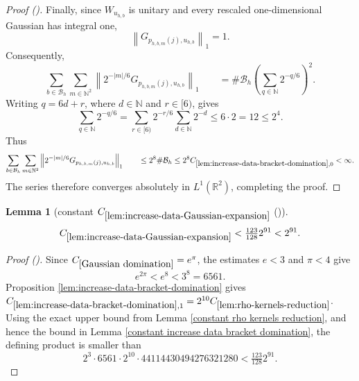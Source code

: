 \documentclass[12pt,reqno]{amsart}
\newcommand{\auto}{{({\tiny\faCar})}}
\theoremstyle{plain}
\newtheorem{lemma}[theorem]{Lemma}
\numberwithin{equation}{section}
\theoremstyle{remark}
\newcommand{\uses}[1]{}
\newcommand{\usesdefs}[1]{}
\begin{document}
\begin{proof}[Proof \auto]
Finally, since \(W_{u_{h,b}}\) is unitary and every rescaled
one-dimensional Gaussian has integral one,
\[
\left\|
G_{p_{h,b,m}(j),u_{h,b}}
\right\|_1
=
1.
\]
Consequently,
\[
\sum_{b\in\mathcal B_h} \sum_{m\in\mathbb N^2} \left\| 2^{-|m|/6} G_{p_{h,b,m}(j),u_{h,b}} \right\|_1 \qquad= \#\mathcal B_h \left( \sum_{q\in\mathbb N}2^{-q/6} \right)^2.
\]
Writing \(q=6d+r\), where \(d\in\mathbb N\) and \(r\in[6)\), gives
\[
\sum_{q\in\mathbb N}2^{-q/6} = \sum_{r\in[6)} 2^{-r/6} \sum_{d\in\mathbb N}2^{-d} \leq 6\cdot2 = 12 \leq2^4.
\]
Thus
\[
\sum_{b\in\mathcal B_h} \sum_{m\in\mathbb N^2} \left\| 2^{-|m|/6} G_{p_{h,b,m}(j),u_{h,b}} \right\|_1 \qquad\leq 2^8\#\mathcal B_h \leq 2^8 C_{\ref{lem:increase-data-bracket-domination},0} < \infty.
\]
The series therefore converges absolutely in
\(L^1(\mathbb R^2)\), completing the proof.
\end{proof}

\begin{lemma}[constant $C_{\ref{lem:increase-data-Gaussian-expansion}}$ \auto]\label{constant increase data Gaussian expansion}\uses{lem:increase-data-bracket-domination,constant increase data bracket domination,constant rho kernels reduction,lem:rho-kernels-reduction,Gaussian domination,lem:increase-data-Gaussian-expansion}\usesdefs{}
\begin{equation}\label{constant increase data Gaussian expansion bound}
C_{\ref{lem:increase-data-Gaussian-expansion}}
<\tfrac{123}{128}2^{91}<2^{91}.
\end{equation}
\end{lemma}
\begin{proof}[Proof \auto]
Since $C_{\ref{Gaussian domination}}=e^\pi$, the estimates $e<3$ and $\pi<4$ give
\[
e^{2\pi}<e^8<3^8=6561.
\]
Proposition \ref{lem:increase-data-bracket-domination} gives
$C_{\ref{lem:increase-data-bracket-domination},1}=2^{10}C_{\ref{lem:rho-kernels-reduction}}$.
Using the exact upper bound from Lemma \ref{constant rho kernels reduction}, and hence the bound in Lemma \ref{constant increase data bracket domination}, the defining product is smaller than
\[
2^3\cdot6561\cdot2^{10}\cdot44114430494276321280
<\tfrac{123}{128}2^{91}.
\]
\end{proof}
\end{document}
